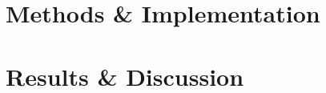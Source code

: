 \documentclass[aps,pra,english,notitlepage,reprint,nofootinbib]{revtex4-1}  %
\begin{document}
\section{Methods \& Implementation}\label{sec:methods}







\section{Results \& Discussion}\label{sec:results discussion}


\end{document}
